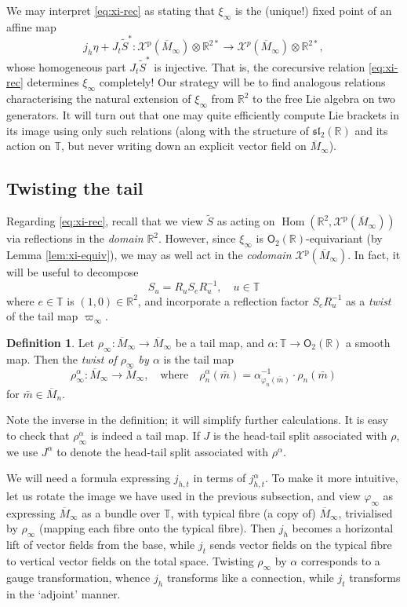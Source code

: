 \documentclass{article}
\def\fsl{\mathfrak{sl}}
\def\RR{\mathbb{R}}
\def\TT{\mathbb{T}}
\def\XX{\mathcal{X}}
\def\O{\mathsf{O}}
\DeclareMathOperator{\Hom}{\mathrm{Hom}}
\def\p{\mathrm{p}}
\theoremstyle{definition}
\newtheorem{defn}{Definition}
\begin{document}
We may interpret \eqref{eq:xi-rec} as stating that $\xi_\infty$ is the (unique!) fixed point of an affine
map
$$
 j_h\eta + J_t\tilde S^* :
\XX^\p(\overline M_\infty)\otimes\RR^{2*} \to
\XX^p(\overline M_\infty)\otimes\RR^{2*}, $$
whose homogeneous part $J_t \tilde S^*$
is injective. That is, the corecursive relation \eqref{eq:xi-rec} determines
$\xi_\infty$ completely!
Our strategy will be to find analogous relations
characterising the natural extension of $\xi_\infty$
from $\RR^2$ to the free Lie algebra on two generators.
It will turn out that one may quite efficiently compute Lie brackets in its image using only such 
relations (along with the structure of $\fsl_2(\RR)$ and its action on $\TT$, but
never writing down an explicit vector field on $\overline M_\infty$).
\subsection{Twisting the tail}
Regarding \eqref{eq:xi-rec}, recall that
we view $\tilde S$ as acting on $\Hom(\RR^2, \XX^\p(\overline M_\infty))$
via reflections in the \emph{domain} $\RR^2$. However, since $\xi_\infty$
is $\O_2(\RR)$-equivariant (by Lemma \ref{lem:xi-equiv}), we may as well
act in the \emph{codomain} $\XX^\p(\overline M_\infty)$. In fact, it will
be useful to decompose
$$ S_u = R_u S_e R_u^{-1},\quad u \in \TT $$
where $e \in \TT$ is $(1,0) \in \RR^2$, and
incorporate a reflection factor $S_e R_u^{-1}$ as a \emph{twist}
of the tail map $\varpi_\infty$.
\begin{defn}
Let $\rho_\infty : \overline M_\infty \to \overline M_\infty$ be a tail map,
and $\alpha : \TT \to \O_2(\RR)$ a smooth map. Then the \emph{twist of $\rho_\infty$ by $\alpha$}
is the tail map 
$$\rho^\alpha_\infty : \overline M_\infty \to \overline M_\infty,\quad\textrm{where}\quad
\rho^\alpha_n(\bar m) = \alpha_{\varphi_n(\bar m)}^{-1} \cdot \rho_n(\bar m) $$
for $\bar m \in \overline M_n$.
\end{defn}
Note the inverse in the definition; it will simplify further calculations.
It is easy to check that $\rho^\alpha_\infty$ is indeed a tail map.
If $J$ is the head-tail split associated with $\rho$,
we use $J^\alpha$ to denote the head-tail split
associated with $\rho^\alpha$. 

We will need a formula expressing
$ j_{h,t}$ in terms of $ j^\alpha_{h,t}$.
To make it more intuitive, let us rotate the image we have used in the previous subsection,
and view $\varphi_\infty$ as expressing $\overline M_\infty$ as a bundle over $\TT$,
with typical fibre (a copy of) $\overline M_\infty$, trivialised by $\rho_\infty$ (mapping each fibre
onto the typical fibre). Then $ j_h$ becomes a horizontal lift of vector fields from the base, while $ j_t$
sends vector fields on the typical fibre to vertical vector fields on the total space.
Twisting $\rho_\infty$ by $\alpha$ corresponds to a gauge transformation, whence
$ j_h$ transforms like a connection, while $ j_t$ transforms in the `adjoint' manner. 
\end{document}
